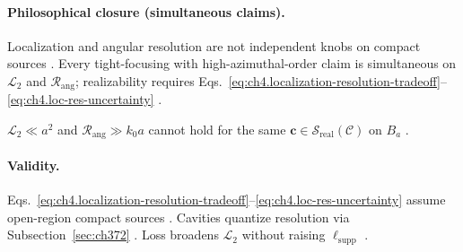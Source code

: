 \paragraph{Philosophical closure (simultaneous claims).}
Localization and angular resolution are not independent knobs on compact sources \cite{hansen1988,stratton1941,harrington2001,jackson1999}. Every tight-focusing
with high-azimuthal-order claim is simultaneous on \(\mathcal{L}_{2}\) and \(\mathcal{R}_{\mathrm{ang}}\); realizability requires
Eqs.~\eqref{eq:ch4.localization-resolution-tradeoff}--\eqref{eq:ch4.loc-res-uncertainty} \cite{devaney2004,hansen1988,harrington2001}.

\begin{corollary}
\label{cor:ch4.no-free-superres}
\(\mathcal{L}_{2}\ll a^{2}\) and \(\mathcal{R}_{\mathrm{ang}}\gg k_{0}a\) cannot hold for the same \(\mathbf{c}\in\mathcal{S}_{\mathrm{real}}(\mathcal{C})\) on \(B_{a}\)
\cite{hansen1988,stratton1941,devaney2004,harrington2001,jackson1999}.
\end{corollary}

\paragraph{Validity.}
Eqs.~\eqref{eq:ch4.localization-resolution-tradeoff}--\eqref{eq:ch4.loc-res-uncertainty} assume open-region compact sources \cite{stratton1941}. Cavities
quantize resolution via Subsection~\ref{sec:ch372} \cite{harrington2001}. Loss broadens \(\mathcal{L}_{2}\) without raising \(\ell_{\mathrm{supp}}\)
\cite{devaney2004,hansen1988}.
